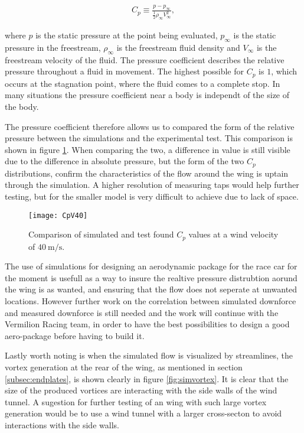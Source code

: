  \begin{align}
    C_p \equiv \frac{p-p_{\infty}}{\frac{1}{2}\rho_{\infty}V_{\infty}^2},
  \end{align}

  where $p$ is the static pressure at the point being evaluated, $p_{\infty}$ is the static pressure in the freestream, $\rho_{\infty}$ is the freestream fluid density and $V_{\infty}$ is the freestream velocity of the fluid. The pressure coefficient describes the relative pressure throughout a fluid in movement. The highest possible for $C_p$ is $1$, which occurs at the stagnation point, where the fluid comes to a complete stop. In many situations the pressure coefficient near a body is independt of the size of the body. 

  The pressure coefficient therefore allows us to compared the form of the relative pressure between the simulations and the experimental test. This comparison is shown in figure \ref{fig:CpV40}. When comparing the two, a difference in value is still visible due to the difference in absolute pressure, but the form of the two $C_p$ distributions, confirm the characteristics of the flow around the wing is uptain through the simulation. A higher resolution of measuring taps would help further testing, but for the smaller model is very difficult to achieve due to lack of space. 

  \begin{figure}
    \texttt{[image: CpV40]}
    \caption{Comparison of simulated and test found $C_p$ values at a wind velocity of $\SI{40}{\metre\per\second}$.}
    \label{fig:CpV40}
  \end{figure}

  The use of simulations for designing an aerodynamic package for the race car for the moment is usefull as a way to insure the realtive pressure distrubtion aorund the wing is as wanted, and ensuring that the flow does not seperate at unwanted locations. However further work on the correlation between simulated downforce and measured downforce is still needed and the work will continue with the Vermilion Racing team, in order to have the best possibilities to design a good aero-package before having to build it.

  Lastly worth noting is when the simulated flow is visualized by streamlines, the vortex generation at the rear of the wing, as mentioned in section \ref{subsec:endplates}, is shown clearly in figure \ref{fig:simvortex}. It is clear that the size of the produced vortices are interacting with the side walls of the wind tunnel. A sugestion for further testing of an wing with such large vortex generation would be to use a wind tunnel with a larger cross-secton to avoid interactions with the side walls.

